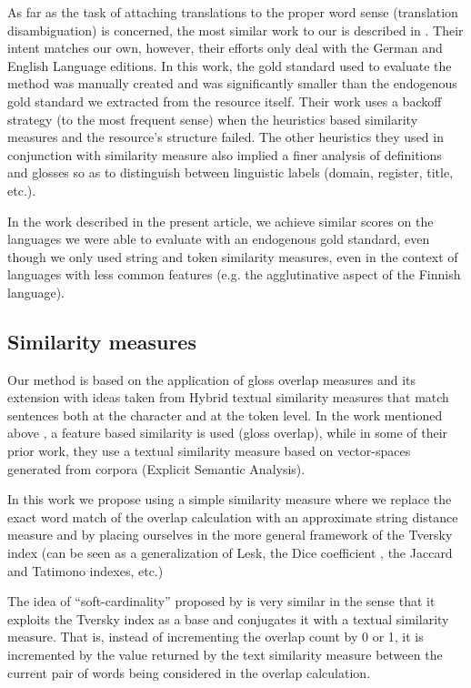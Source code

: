 \documentclass[10pt, a4paper]{article}
\begin{document}
As far as the task of attaching translations to the proper word sense (translation disambiguation) is concerned, the most similar work to our is described in \cite{meyer-gurevych:2012:PAPERS}. Their intent matches our own, however, their efforts  only deal with the German and English Language editions. In this work, the gold standard used to evaluate the method was manually created and was significantly smaller than the endogenous gold standard we extracted from the resource itself. Their work uses a backoff strategy (to the most frequent sense) when the heuristics based similarity measures and the resource's structure failed. The other heuristics they used in conjunction with similarity measure also implied a finer analysis of definitions and glosses so as to distinguish between linguistic labels (domain, register, title, etc.).

In the work described in the present article, we achieve similar scores on the languages we were able to evaluate with an endogenous gold standard, even though we only used string and token similarity measures, even in the context of languages with less common features (e.g. the agglutinative aspect of the Finnish language).

\subsection{Similarity measures}
Our method is based on the application of gloss overlap measures and its extension with ideas taken from Hybrid textual similarity measures that match sentences both at the character and at the token level. In the work mentioned above \cite{meyer-gurevych:2012:PAPERS}, a feature based similarity is used (gloss overlap), while in some of their prior work, \cite{MeyerGurevych:2010}  they use a textual similarity measure based on vector-spaces generated from corpora (Explicit Semantic Analysis).

In this work we propose using a simple similarity measure where we replace the exact word match of the overlap calculation with an approximate string distance measure and by placing ourselves in the more general framework of the Tversky index (can be seen as a generalization of Lesk, the Dice coefficient , the Jaccard and Tatimono indexes, etc.)

 The idea of ``soft-cardinality'' proposed by \cite{Jimenez2010,Jimenez2012} is very similar in the sense that it exploits the Tversky index as a base and conjugates it with a textual similarity measure. That is, instead of incrementing the overlap count by 0 or 1, it is incremented by the value returned by the text similarity measure between the current pair of words being considered in the overlap calculation.
 
\end{document}
